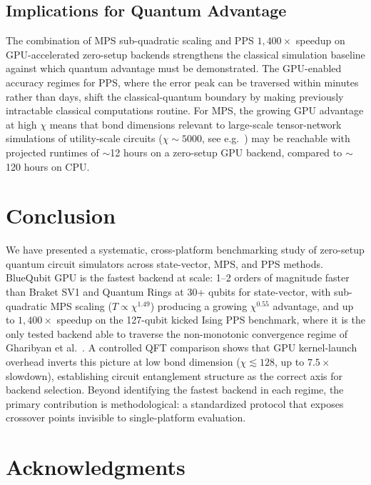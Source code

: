 \documentclass[conference,10pt]{IEEEtran}
\begin{document}
 \subsection{Implications for Quantum Advantage}
 
The combination of MPS sub-quadratic scaling and PPS $1{,}400\times$ speedup on GPU-accelerated zero-setup backends strengthens the classical simulation baseline against which quantum advantage must be demonstrated. The GPU-enabled accuracy regimes for PPS, where the error peak can be traversed within minutes rather than days, shift the classical-quantum boundary by making previously intractable classical computations routine. For MPS, the growing GPU advantage at high $\chi$ means that bond dimensions relevant to large-scale tensor-network simulations of utility-scale circuits ($\chi \sim 5000$, see e.g.~\cite{begusic2024converged}) may be reachable with projected runtimes of $\sim$12 hours on a zero-setup GPU backend, compared to $\sim$120 hours on CPU.

\section{Conclusion}
\label{sec:conclusion}
 
We have presented a systematic, cross-platform benchmarking study of zero-setup quantum circuit simulators across state-vector, MPS, and PPS methods. BlueQubit GPU is the fastest backend at scale: 1--2 orders of magnitude faster than Braket SV1 and Quantum Rings at 30+ qubits for state-vector, with sub-quadratic MPS scaling ($T \propto \chi^{1.49}$) producing a growing $\chi^{0.55}$ advantage, and up to $1{,}400\times$ speedup on the 127-qubit kicked Ising PPS benchmark, where it is the only tested backend able to traverse the non-monotonic convergence regime of Gharibyan et al.~\cite{gharibyan2025practical}. A controlled QFT comparison shows that GPU kernel-launch overhead inverts this picture at low bond dimension ($\chi \lesssim 128$, up to $7.5\times$ slowdown), establishing circuit entanglement structure as the correct axis for backend selection. Beyond identifying the fastest backend in each regime, the primary contribution is methodological: a standardized protocol that exposes crossover points invisible to single-platform evaluation.

\section*{Acknowledgments}
 
\end{document}
